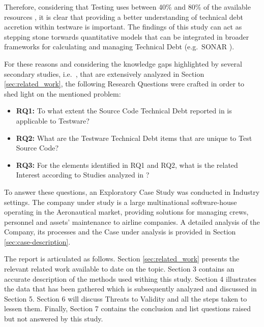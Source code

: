 Therefore, considering that Testing uses between 40\% and 80\% of the available resources \cite{exploratorying_testing_td}, it is clear that providing a better understanding of technical debt accretion within testware is important. The findings of this study can act as stepping stone torwards quantitative models that can be integrated in broader frameworks for calculating and managing Technical Debt (e.g.\ SONAR \cite{sonar_evaluate_td}).

For these reasons and considering the knowledge gaps highlighted by several secondary studies, i.e.\ \cite{mapping_study_td, exploration_of_td, exploration_of_td2}, that are extensively analyzed in Section \ref{sec:related_work}, the following Research Questions were crafted in order to shed light on the mentioned problem:

\begin{itemize}
    \itemsep0em 
    
    \item \textbf{RQ1:} To what extent the Source Code Technical Debt reported in \cite{mapping_study_td} is applicable to Testware?
    
    \item \textbf{RQ2:} What are the Testware Technical Debt items that are unique to Test Source Code?
    
    \item \textbf{RQ3:} For the elements identified in RQ1 and RQ2, what is the related Interest according to Studies analyzed in \cite{mapping_study_td}?
    
\end{itemize}


To answer these questions, an Exploratory Case Study was conducted in Industry settings. The company under study is a large multinational software-house operating in the Aeronautical market, providing solutions for managing crews, personnel and assets' maintenance to airline companies. A detailed analysis of the Company, its processes and the Case under analysis is provided in Section \ref{sec:case-description}.

The report is articulated as follows. Section \ref{sec:related_work} presents the relevant related work available to date on the topic. Section 3 contains an accurate description of the methods used withing this study. Section 4 illustrates the data that has been gathered which is subsequently analyzed and discussed in Section 5. Section 6 will discuss Threats to Validity and all the steps taken to lessen them. Finally, Section 7 contains the conclusion and list questions raised but not answered by this study. 


